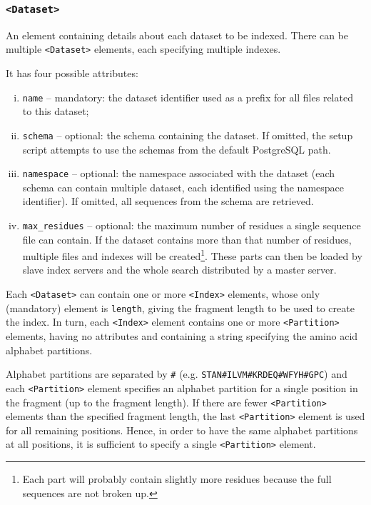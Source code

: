\documentclass[10pt,letter]{article}
\begin{document}
\subsubsection*{\texttt{<Dataset>}}

An element containing details about each dataset to be indexed. There can be multiple \texttt{<Dataset>} elements, each specifying multiple indexes.

It has four possible attributes:
\begin{enumerate}[(i)]
\item \texttt{name} -- mandatory: the dataset identifier used as a prefix for all files related to this dataset;
\item \texttt{schema} -- optional: the schema containing the dataset. If omitted, the setup script attempts to use the schemas from the default PostgreSQL path.
\item \texttt{namespace} -- optional: the namespace associated with the dataset (each schema can contain multiple dataset, each identified using the namespace identifier). If omitted, all sequences from the schema are retrieved.
\item \texttt{max\_residues} -- optional: the maximum number of residues a single sequence file can contain. If the dataset contains more than that number of residues, multiple files and indexes will be created\footnote{Each part will probably contain slightly more residues because the full sequences are not broken up.}. These parts can then be loaded by slave index servers and the whole search distributed by a master server.
\end{enumerate}

Each \texttt{<Dataset>} can contain one or more \texttt{<Index>} elements, whose only (mandatory) element is \texttt{length}, giving the fragment length to be used to create the index. In turn, each \texttt{<Index>} element contains one or more \texttt{<Partition>} elements, having no attributes and containing a string specifying the amino acid alphabet partitions.

Alphabet partitions are separated by \texttt{\#} (e.g. \texttt{STAN\#ILVM\#KRDEQ\#WFYH\#GPC}) and each \texttt{<Partition>} element specifies an alphabet partition for a single position in the fragment (up to the fragment length). If there are fewer \texttt{<Partition>} elements than the specified fragment length, the last \texttt{<Partition>} element is used for all remaining positions. Hence, in order to have the same alphabet partitions at all positions, it is sufficient to specify a single \texttt{<Partition>} element. 
\end{document}
